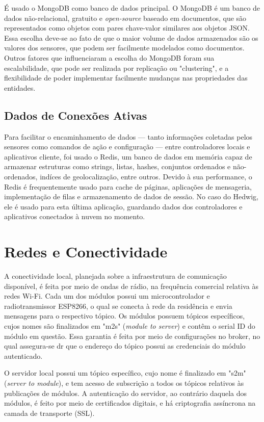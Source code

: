 É usado o MongoDB como banco de dados principal. O MongoDB é um banco de dados não-relacional, gratuito e \emph{open-source} baseado em documentos, que são representados como objetos com pares chave-valor similares aos objetos JSON. Essa escolha deve-se ao fato de que o maior volume de dados armazenados são os valores dos sensores, que podem ser facilmente modelados como documentos. Outros fatores que influenciaram a escolha do MongoDB foram sua escalabilidade, que pode ser realizada por replicação ou "clustering", e a flexibilidade de poder implementar facilmente mudanças nas propriedades das entidades.

\subsection{Dados de Conexões Ativas}

Para facilitar o encaminhamento de dados --- tanto informações coletadas pelos sensores como comandos de ação e configuração --- entre controladores locais e aplicativos cliente, foi usado o Redis, um banco de dados em memória capaz de armazenar estruturas como strings, listas, hashes, conjuntos ordenados e não-ordenados, indíces de geolocalização, entre outros. Devido à sua performance, o Redis é frequentemente usado para cache de páginas, aplicações de mensageria, implementação de filas e armazenamento de dados de sessão. No caso do Hedwig, ele é usado para esta última aplicação, guardando dados dos controladores e aplicativos conectados à nuvem no momento.

\section{Redes e Conectividade}

A conectividade local, planejada sobre a infraestrutura de comunicação disponível, é feita por meio de ondas de rádio, na frequência comercial relativa às redes Wi-Fi. Cada um dos módulos possui um microcontrolador e radiotransmissor ESP8266, o qual se conecta à rede da residência e envia mensagens para o respectivo tópico. Os módulos possuem tópicos específicos, cujos nomes são finalizados em "m2s" (\emph{module to server}) e contêm o serial ID do módulo em questão. Essa garantia é feita por meio de configurações no broker, no qual assegura-se dr que o endereço do tópico possui as credenciais do módulo autenticado.

O servidor local possui um tópico específico, cujo nome é finalizado em "s2m" (\emph{server to module}), e tem acesso de subscrição a todos os tópicos relativos às publicações de módulos. A autenticação do servidor, ao contrário daquela dos módulos, é feito por meio de certificados digitais, e há criptografia assíncrona na camada de transporte (SSL).

